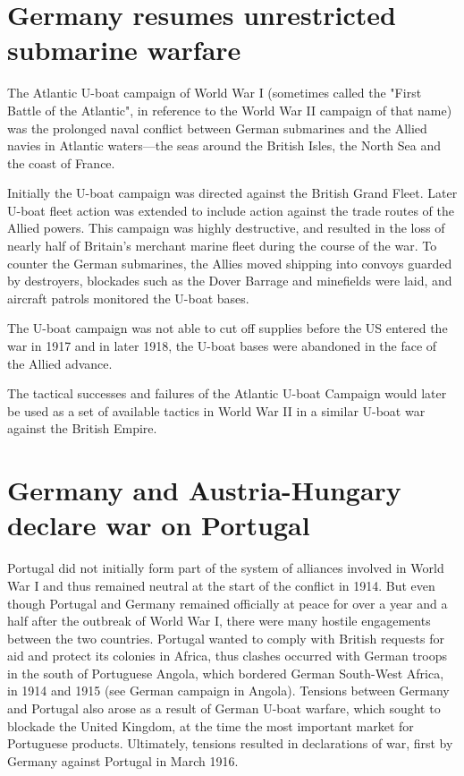 \documentclass[a4paper,]{book}
\begin{document}
\section{Germany resumes unrestricted submarine warfare}

The Atlantic U-boat campaign of World War I (sometimes called the "First Battle of the Atlantic", in reference to the World War II campaign of that name) was the prolonged naval conflict between German submarines and the Allied navies in Atlantic waters—the seas around the British Isles, the North Sea and the coast of France.

Initially the U-boat campaign was directed against the British Grand Fleet. Later U-boat fleet action was extended to include action against the trade routes of the Allied powers. This campaign was highly destructive, and resulted in the loss of nearly half of Britain's merchant marine fleet during the course of the war. To counter the German submarines, the Allies moved shipping into convoys guarded by destroyers, blockades such as the Dover Barrage and minefields were laid, and aircraft patrols monitored the U-boat bases.

The U-boat campaign was not able to cut off supplies before the US entered the war in 1917 and in later 1918, the U-boat bases were abandoned in the face of the Allied advance.

The tactical successes and failures of the Atlantic U-boat Campaign would later be used as a set of available tactics in World War II in a similar U-boat war against the British Empire. 

\section{Germany and Austria-Hungary declare war on Portugal}

Portugal did not initially form part of the system of alliances involved in World War I and thus remained neutral at the start of the conflict in 1914. But even though Portugal and Germany remained officially at peace for over a year and a half after the outbreak of World War I, there were many hostile engagements between the two countries. Portugal wanted to comply with British requests for aid and protect its colonies in Africa, thus clashes occurred with German troops in the south of Portuguese Angola, which bordered German South-West Africa, in 1914 and 1915 (see German campaign in Angola). Tensions between Germany and Portugal also arose as a result of German U-boat warfare, which sought to blockade the United Kingdom, at the time the most important market for Portuguese products. Ultimately, tensions resulted in declarations of war, first by Germany against Portugal in March 1916.
\end{document}
